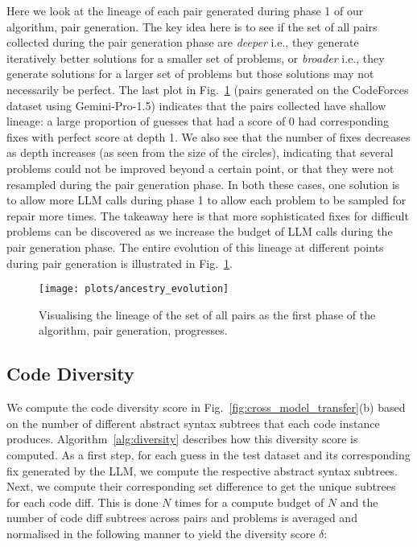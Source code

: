 \documentclass[11pt, a4paper, logo, copyright]{googledeepmind}
\begin{document}
Here we look at the lineage of each pair generated during phase 1 of our algorithm, pair generation. The key idea here is to see if the set of all pairs collected during the pair generation phase are \emph{deeper} i.e., they generate iteratively better solutions for a smaller set of problems, or \emph{broader} i.e., they generate solutions for a larger set of problems but those solutions may not necessarily be perfect. The last plot in Fig.~\ref{fig:ancestry_evolution} (pairs generated on the CodeForces dataset using Gemini-Pro-1.5) indicates that the pairs collected have shallow lineage: a large proportion of guesses that had a score of 0 had corresponding fixes with perfect score at depth 1. We also see that the number of fixes decreases as depth increases (as seen from the size of the circles), indicating that several problems could not be improved beyond a certain point, or that they were not resampled during the pair generation phase. In both these cases, one solution is to allow more LLM calls during phase 1 to allow each problem to be sampled for repair more times. The takeaway here is that more sophisticated fixes for difficult problems can be discovered as we increase the budget of LLM calls during the pair generation phase. The entire evolution of this lineage at different points during pair generation is illustrated in Fig.~\ref{fig:ancestry_evolution}.

\begin{figure}
    \centering
    \texttt{[image: plots/ancestry\_evolution]}
    \caption{Visualising the lineage of the set of all pairs as the first phase of the algorithm, pair generation, progresses.}
    \label{fig:ancestry_evolution}
\end{figure}

\subsection{Code Diversity}\label{sec:appendix_diversity}

We compute the code diversity score in Fig.~\ref{fig:cross_model_transfer}(b) based on the number of different abstract syntax subtrees that each code instance produces. Algorithm~\ref{alg:diversity} describes how this diversity score is computed. As a first step, for each guess in the test dataset and its corresponding fix generated by the LLM, we compute the respective abstract syntax subtrees. Next, we compute their corresponding set difference to get the unique subtrees for each code diff. This is done $N$ times for a compute budget of $N$ and the number of code diff subtrees across pairs and problems is averaged and normalised in the following manner to yield the diversity score $\delta$:
\end{document}
